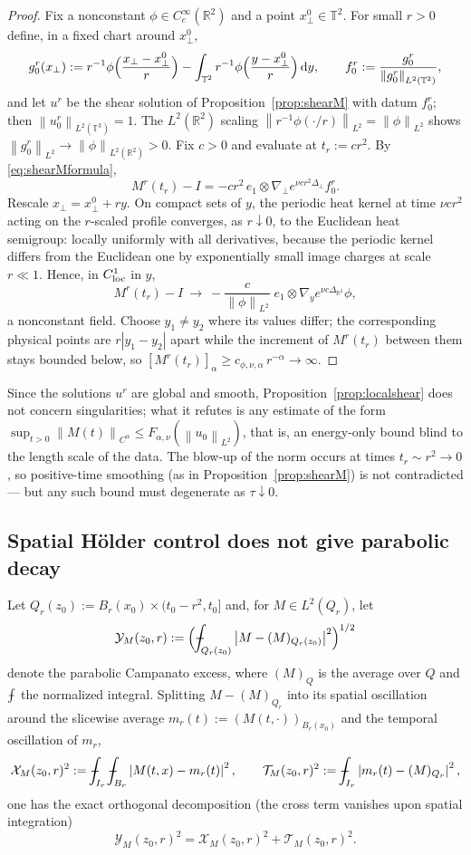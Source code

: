 \documentclass[11pt,reqno]{amsart}
\newcommand{\R}{\mathbb{R}}
\newcommand{\T}{\mathbb{T}}
\newcommand{\dd}{\,\mathrm{d}}
\newcommand{\norm}[1]{\left\lVert #1\right\rVert}
\newcommand{\abs}[1]{\left\lvert #1\right\rvert}
\def\Xint#1{\mathchoice
  {\XXint\displaystyle\textstyle{#1}}%
  {\XXint\textstyle\scriptstyle{#1}}%
  {\XXint\scriptstyle\scriptscriptstyle{#1}}%
  {\XXint\scriptscriptstyle\scriptscriptstyle{#1}}%
  \!\int}
\def\XXint#1#2#3{{\setbox0=\hbox{$#1{#2#3}{\int}$}
  \vcenter{\hbox{$#2#3$}}\kern-.5\wd0}}
\def\fint{\Xint-}
\theoremstyle{definition}
\begin{document}
\begin{proof}
Fix a nonconstant $\phi\in C_c^\infty(\R^2)$ and a point $x_\perp^0\in\T^2$. For small
$r>0$ define, in a fixed chart around $x_\perp^0$,
\[
  g^r_0(x_\perp):=r^{-1}\phi\Bigl(\frac{x_\perp-x_\perp^0}{r}\Bigr)
  -\int_{\T^2}r^{-1}\phi\Bigl(\frac{y-x_\perp^0}{r}\Bigr)\dd y,
  \qquad f^r_0:=\frac{g^r_0}{\norm{g^r_0}_{L^2(\T^2)}},
\]
and let $u^r$ be the shear solution of Proposition~\ref{prop:shearM} with datum
$f^r_0$; then $\norm{u^r_0}_{L^2(\T^3)}=1$. The $L^2(\R^2)$ scaling
$\norm{r^{-1}\phi(\cdot/r)}_{L^2}=\norm{\phi}_{L^2}$ shows
$\norm{g^r_0}_{L^2}\to\norm{\phi}_{L^2(\R^2)}>0$. Fix $c>0$ and evaluate at $t_r:=cr^2$.
By \eqref{eq:shearMformula},
\[
  M^r(t_r)-I=-c r^2\,e_1\otimes\nabla_\perp e^{\nu cr^2\Delta_\perp}f^r_0 .
\]
Rescale $x_\perp=x^0_\perp+ry$. On compact sets of $y$, the periodic heat kernel at time
$\nu cr^2$ acting on the $r$-scaled profile converges, as $r\downarrow0$, to the Euclidean
heat semigroup: locally uniformly with all derivatives, because the periodic kernel
differs from the Euclidean one by exponentially small image charges at scale
$r\ll1$. Hence, in $C^1_{\rm loc}$ in $y$,
\[
  M^r(t_r)-I\ \longrightarrow\ -\frac{c}{\norm{\phi}_{L^2}}\;e_1\otimes
  \nabla_y e^{\nu c\Delta_{\R^2}}\phi ,
\]
a nonconstant field. Choose $y_1\ne y_2$ where its values differ; the corresponding
physical points are $r\abs{y_1-y_2}$ apart while the increment of $M^r(t_r)$ between them
stays bounded below, so
$[M^r(t_r)]_{\alpha}\ge c_{\phi,\nu,\alpha}\,r^{-\alpha}\to\infty$.
\end{proof}

Since the solutions $u^r$ are global and smooth, Proposition~\ref{prop:localshear} does
not concern singularities; what it refutes is any estimate of the form
$\sup_{t>0}\norm{M(t)}_{C^\alpha}\le F_{\alpha,\nu}(\norm{u_0}_{L^2})$, that is, an
energy-only bound blind to the length scale of the data. The blow-up of the norm occurs at
times $t_r\sim r^2\to0$, so positive-time smoothing (as in
Proposition~\ref{prop:shearM}) is not contradicted --- but any such bound must degenerate
as $\tau\downarrow0$.

\subsection{Spatial H\"older control does not give parabolic decay}

Let $Q_r(z_0):=B_r(x_0)\times(t_0-r^2,t_0]$ and, for $M\in L^2(Q_r)$, let
\[
  \mathcal Y_M(z_0,r):=\Bigl(\fint_{Q_r(z_0)}\abs{M-(M)_{Q_r(z_0)}}^2\Bigr)^{1/2}
\]
denote the parabolic Campanato excess, where $(M)_{Q}$ is the average over $Q$ and
$\fint$ the normalized integral. Splitting $M-(M)_{Q_r}$ into its spatial oscillation
around the slicewise average $m_r(t):=(M(t,\cdot))_{B_r(x_0)}$ and the temporal
oscillation of $m_r$,
\[
  \mathcal X_M(z_0,r)^2:=\fint_{I_r}\fint_{B_r}\abs{M(t,x)-m_r(t)}^2,
  \qquad
  \mathcal T_M(z_0,r)^2:=\fint_{I_r}\abs{m_r(t)-(M)_{Q_r}}^2 ,
\]
one has the exact orthogonal decomposition (the cross term vanishes upon spatial
integration)
\begin{equation}\label{eq:split}
  \mathcal Y_M(z_0,r)^2=\mathcal X_M(z_0,r)^2+\mathcal T_M(z_0,r)^2 .
\end{equation}
\end{document}
